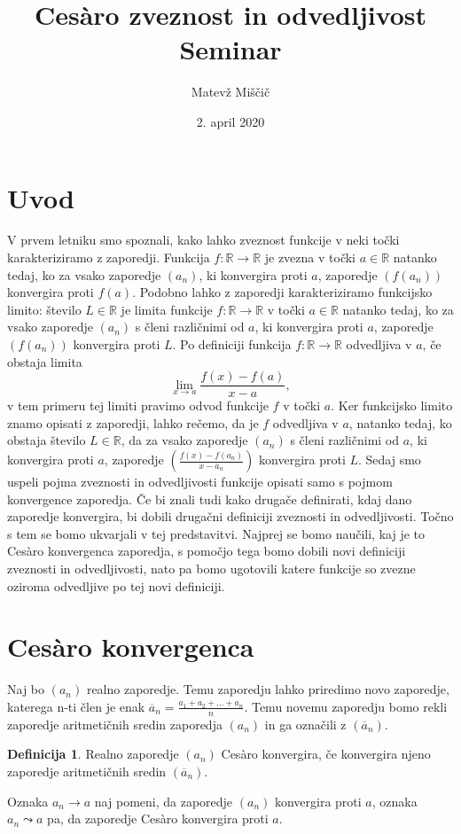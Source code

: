\documentclass[a4paper,12pt]{article}
\title{Ces\`{a}ro zveznost in odvedljivost \\ Seminar}
\author{Matevž Miščič}
\date{2. april 2020}
\theoremstyle{definition}
\newtheorem{definicija}{Definicija}
\theoremstyle{plain}
\begin{document}
\maketitle{}

\section*{Uvod}
V prvem letniku smo spoznali, kako lahko zveznost funkcije v neki točki karakteriziramo z zaporedji. Funkcija $f: \mathbb{R} \rightarrow \mathbb{R}$ je zvezna v točki $a \in \mathbb{R}$ natanko tedaj, ko za vsako zaporedje $(a_n)$, ki konvergira proti $a$, zaporedje $(f(a_n))$ konvergira proti $f(a)$. Podobno lahko z zaporedji karakteriziramo funkcijsko limito: število $L \in \mathbb{R}$ je limita funkcije $f: \mathbb{R} \rightarrow \mathbb{R}$ v točki $a \in \mathbb{R}$ natanko tedaj, ko za vsako zaporedje $(a_n)$ s členi različnimi od $a$, ki konvergira proti $a$, zaporedje $(f(a_n))$ konvergira proti $L$. Po definiciji funkcija $f: \mathbb{R} \rightarrow \mathbb{R}$ odvedljiva v $a$, če obstaja limita $$\lim_{x \rightarrow a} \frac{f(x)-f(a)}{x-a},$$ v tem primeru tej limiti pravimo odvod funkcije $f$ v točki $a$. Ker funkcijsko limito znamo opisati z zaporedji, lahko rečemo, da je $f$ odvedljiva v $a$, natanko tedaj, ko obstaja število $L \in \mathbb{R}$, da za vsako zaporedje $(a_n)$ s členi različnimi od $a$, ki konvergira proti $a$, zaporedje $(\frac{f(x)-f(a_n)}{x-a_n})$ konvergira proti $L$. Sedaj smo uspeli pojma zveznosti in odvedljivosti funkcije opisati samo s pojmom konvergence zaporedja. Če bi znali tudi kako drugače definirati, kdaj dano zaporedje konvergira, bi dobili drugačni definiciji zveznosti in odvedljivosti. Točno s tem se bomo ukvarjali v tej predstavitvi. Najprej se bomo naučili, kaj je to Ces\`{a}ro konvergenca zaporedja, s pomočjo tega bomo dobili novi definiciji zveznosti in odvedljivosti, nato pa bomo ugotovili katere funkcije so zvezne oziroma odvedljive po tej novi definiciji.



\section{Ces\`{a}ro konvergenca}
Naj bo $(a_n)$ realno zaporedje. Temu zaporedju lahko priredimo novo zaporedje, katerega n-ti člen je enak $\overline{a}_n = \frac{a_1+a_2+\ldots+a_n}{n}$. Temu novemu zaporedju bomo rekli zaporedje aritmetičnih sredin zaporedja $(a_n)$ in ga označili z $(\overline{a}_n)$.
\begin{definicija}
    Realno zaporedje $(a_n)$ Ces\`{a}ro konvergira, če konvergira njeno zaporedje aritmetičnih sredin $(\overline{a}_n)$.
\end{definicija}
Oznaka $a_n \rightarrow a$ naj pomeni, da zaporedje $(a_n)$ konvergira proti $a$, oznaka $a_n \leadsto a$ pa, da zaporedje Ces\`{a}ro konvergira proti $a$. 
\end{document}
